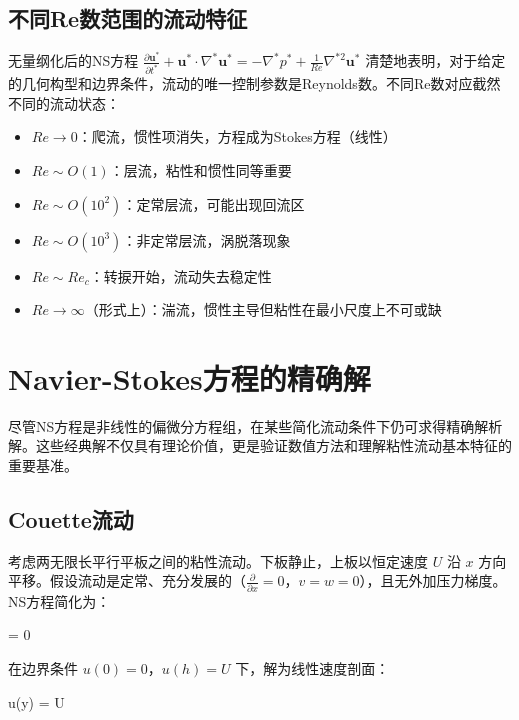 \subsection{不同Re数范围的流动特征}

无量纲化后的NS方程 $\frac{\partial\mathbf{u}^{*}}{\partial t^{*}} + \mathbf{u}^{*}\cdot\nabla^{*}\mathbf{u}^{*} = -\nabla^{*}p^{*} + \frac{1}{Re}\nabla^{*2}\mathbf{u}^{*}$ 清楚地表明，对于给定的几何构型和边界条件，流动的唯一控制参数是Reynolds数。不同Re数对应截然不同的流动状态：

\begin{itemize}
    \item $Re \to 0$：爬流，惯性项消失，方程成为Stokes方程（线性）
    \item $Re \sim O(1)$：层流，粘性和惯性同等重要
    \item $Re \sim O(10^{2})$：定常层流，可能出现回流区
    \item $Re \sim O(10^{3})$：非定常层流，涡脱落现象
    \item $Re \sim Re_{c}$：转捩开始，流动失去稳定性
    \item $Re \to \infty$（形式上）：湍流，惯性主导但粘性在最小尺度上不可或缺
\end{itemize}

\section{Navier-Stokes方程的精确解}

尽管NS方程是非线性的偏微分方程组，在某些简化流动条件下仍可求得精确解析解。这些经典解不仅具有理论价值，更是验证数值方法和理解粘性流动基本特征的重要基准。

\subsection{Couette流动}

考虑两无限长平行平板之间的粘性流动。下板静止，上板以恒定速度 $U$ 沿 $x$ 方向平移。假设流动是定常、充分发展的（$\frac{\partial}{\partial x}=0$，$v=w=0$），且无外加压力梯度。NS方程简化为：

\begin{myformula}
     = 0
\end{myformula}

在边界条件 $u(0)=0$，$u(h)=U$ 下，解为线性速度剖面：

\begin{myformula}
    u(y) = U
\end{myformula}

